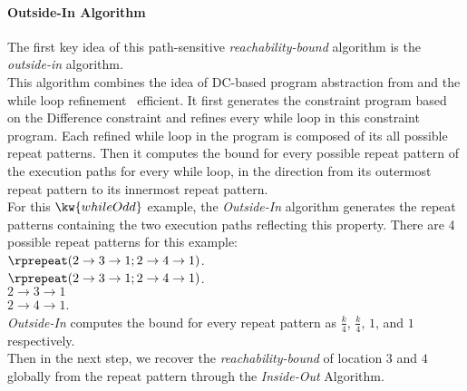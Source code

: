 \paragraph*{Outside-In Algorithm}
The first key idea of this path-sensitive \emph{reachability-bound} algorithm is the \emph{outside-in} algorithm.
\\
This algorithm combines the idea of DC-based program abstraction from \cite{sinn2017complexity}
and the while loop refinement~\cite{GulwaniJK09} efficient.
It first generates the constraint program based on the Difference constraint and refines every while loop in this constraint program.
Each refined while loop in the program is composed of its all possible repeat patterns.
Then it
computes the bound for every possible repeat pattern of the execution paths for every while loop,
in the direction
from its outermost repeat pattern to its innermost repeat pattern.
\\
For this $\kw{whileOdd}$ example, the \emph{Outside-In} algorithm generates 
the repeat patterns containing the two execution paths reflecting this property.
There are 4 possible repeat patterns for this example:
\\
$\rprepeat(2 \to 3 \to 1; 2 \to 4 \to 1)$.
\\
$\rprepeat(2 \to 3 \to 1; 2 \to 4 \to 1)$.
\\
$2 \to 3 \to 1$
\\
$2 \to 4 \to 1$.
\\
\emph{Outside-In} computes the bound for every repeat pattern
as $\frac{k}{4}$, $\frac{k}{4}$, $1$, and $1$ respectively.
\\
Then in the next step, we recover the \emph{reachability-bound} of location $3$ and $4$ globally from the
repeat pattern through the \emph{Inside-Out} Algorithm.
